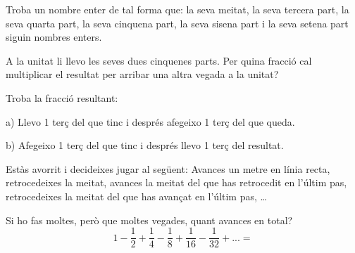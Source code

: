\begin{mylist}
	\exer  Troba un nombre enter de tal forma que: la seva meitat, la seva tercera part, la seva quarta part, la seva cinquena part, la seva sisena part i la seva setena part siguin nombres enters.






	\exer  A la unitat li llevo les seves dues cinquenes parts. Per quina fracció cal multiplicar el resultat per arribar una altra vegada a la unitat?




	\exer  Troba la fracció resultant:


a) Llevo 1 terç del que tinc i després afegeixo 1 terç del que queda.

b) Afegeixo 1 terç del que tinc i després llevo 1 terç del resultat.





	\exer  Estàs avorrit i decideixes jugar al següent: Avances un metre en línia recta, retrocedeixes la meitat, avances la meitat del que has retrocedit en l'últim pas, retrocedeixes la meitat del que has avançat en l'últim pas, {\dots}


Si ho fas moltes, però que moltes vegades, quant avances en total?
\[1-\frac{1}{2} +\frac{1}{4} -\frac{1}{8} +\frac{1}{16} -\frac{1}{32} +...=\] 

\end{mylist}


